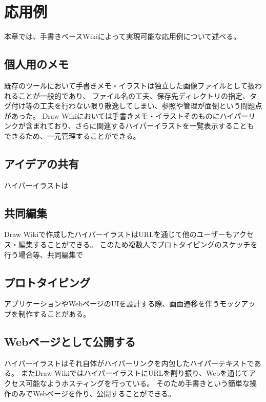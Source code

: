 \chapter{応用例}
\label{chap:ouyou}

本章では、手書きベースWikiによって実現可能な応用例について述べる。

\newpage

\section{個人用のメモ}
既存のツールにおいて手書きメモ・イラストは独立した画像ファイルとして扱われることが一般的であり、
ファイル名の工夫、保存先ディレクトリの指定、タグ付け等の工夫を行わない限り散逸してしまい、参照や管理が面倒という問題点があった。
Draw Wikiにおいては手書きメモ・イラストそのものにハイパーリンクが含まれており、さらに関連するハイパーイラストを一覧表示することも
できるため、一元管理することができる。

\section{アイデアの共有}
ハイパーイラストは

\section{共同編集}
Draw Wikiで作成したハイパーイラストはURLを通じて他のユーザーもアクセス・編集することができる。
このため複数人でプロトタイピングのスケッチを行う場合等、共同編集で

\section{プロトタイピング}
アプリケーションやWebページのUIを設計する際、画面遷移を伴うモックアップを制作することがある。

\section{Webページとして公開する}
ハイパーイラストはそれ自体がハイパーリンクを内包したハイパーテキストである。
またDraw WikiではハイパーイラストにURLを割り振り、Webを通じてアクセス可能なようホスティングを行っている。
そのため手書きという簡単な操作のみでWebページを作り、公開することができる。



